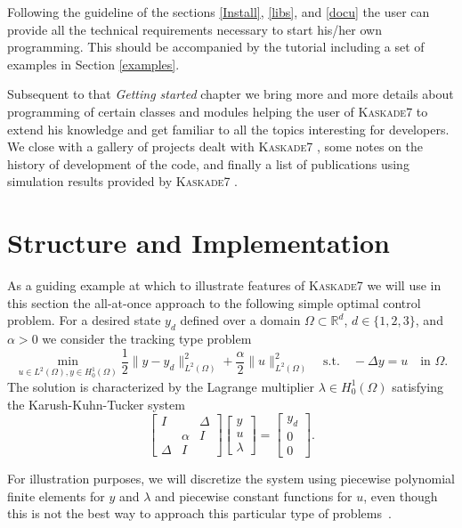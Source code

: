 \documentclass[11pt]{article}
\newcommand{\R}{\mathbb{R}}
\newcommand{\K}{\textsc{Kaskade7 }}
\begin{document}
Following the guideline of the sections \ref{Install}, \ref{libs}, and \ref{docu}
the user can provide all the technical requirements necessary to start his/her own programming. 
This should be accompanied by the tutorial including a set of examples in Section \ref{examples}.

Subsequent to that {\em Getting started} chapter we bring more and more details about programming
of certain classes and modules helping the user of \K to extend his knowledge and get familiar to
all the topics interesting for developers. We close with a gallery of projects dealt with \K, some notes
on the history of development of the code, and finally a list of publications using simulation results
provided by \K.


\section{Structure and Implementation} \label{design}

As a guiding example at which to illustrate features of \K we will use in this section the all-at-once approach to the following simple optimal control problem. 
For a desired state $y_d$ defined over a domain $\Omega\subset \R^d$, $d\in\{1,2,3\}$, and $\alpha>0$ we consider the tracking type problem
\[
  \min_{u\in L^2(\Omega), y\in H^1_0(\Omega)} \frac{1}{2}\|y-y_d\|_{L^2(\Omega)}^2 + \frac{\alpha}{2} \|u\|_{L^2(\Omega)}^2 \quad\text{s.t.}\quad -\Delta y = u \quad\text{in $\Omega$}.
\]
The solution is characterized by the Lagrange multiplier $\lambda\in H^1_0(\Omega)$ satisfying the Karush-Kuhn-Tucker system
\[
  \begin{bmatrix}
    I & & \Delta \\ & \alpha & I \\ \Delta & I &
  \end{bmatrix}
  \begin{bmatrix}
    y \\ u \\ \lambda
  \end{bmatrix}
  =
  \begin{bmatrix}
    y_d \\ 0 \\ 0
  \end{bmatrix}.
\]

For illustration purposes, we will discretize the system using piecewise polynomial finite elements for $y$ and $\lambda$ and piecewise constant functions for $u$, even though this is not the best way to approach this particular type of problems~\cite{HinzeEtAl09,WeiserGaenzlerSchiela2008}.
\end{document}
